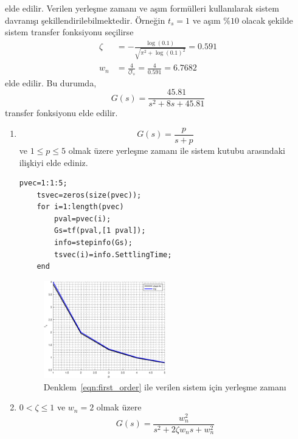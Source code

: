 elde edilir. Verilen yerleşme zamanı ve aşım formülleri kullanılarak sistem davranışı şekillendirilebilmektedir. Örneğin $t_s=1$ ve aşım $\%10$ olacak şekilde sistem transfer fonksiyonu seçilirse
\begin{equation} 
\begin{split} 
    \zeta&=-\frac{\log(0.1)}{\sqrt{\pi^2+\log(0.1)^2}}=0.591\\
    w_n&=\frac{4}{\zeta t_s}=\frac{4}{0.591}=6.7682
\end{split} 
\end{equation} 
elde edilir. Bu durumda,
\begin{equation} 
    G(s)=\frac{45.81}{s^2+8s+45.81}
\end{equation} 
transfer fonksiyonu elde edilir. 
\begin{enumerate}
    \item 
    \begin{equation}
        G(s)=\frac{p}{s+p}
        \label{fig:first_order}
    \end{equation}
    ve $1\leq p\leq 5$ olmak üzere yerleşme zamanı ile sistem kutubu arasındaki ilişkiyi elde ediniz.
    \begin{lstlisting}[style=Matlab-editor]
    pvec=1:1:5;
    tsvec=zeros(size(pvec));
    for i=1:length(pvec)
        pval=pvec(i);
        Gs=tf(pval,[1 pval]);
        info=stepinfo(Gs);
        tsvec(i)=info.SettlingTime;
    end
    \end{lstlisting}
    \begin{figure}[!htb]
        \centering
        \includegraphics[width=0.5\textwidth]{img/lec4_plot1}
        \caption{Denklem~\ref{eqn:first_order} ile verilen sistem için yerleşme zamanı}
        \label{fig:lec4_plot1}
    \end{figure}
    \item $0<\zeta\leq1$ ve $w_n=2$ olmak üzere 
    \begin{equation}
        G(s)=\frac{w_n^2}{s^2+2\zeta w_ns+w_n^2}
        \label{eqn:second_order}
    \end{equation}

\end{enumerate}
